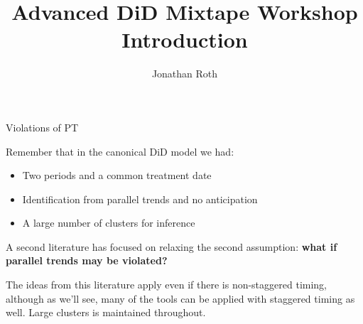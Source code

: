 \documentclass[aspectratio = 169, 13pt]{beamer}
\author{Jonathan Roth}
\title[Advanced DiD Mixtape Workshop]{Advanced DiD Mixtape Workshop \\ Introduction}
\begin{document}

\begin{frame}{Violations of PT}
  \addtocounter{framenumber}{-1}
	\begin{wideitemize}
		\item
		Remember that in the canonical DiD model we had:
		    
		\begin{itemize}
			\item 
			      Two periods and a common treatment date
			              
			\item
			      Identification from parallel trends and no anticipation
			              
			\item
			      A large number of clusters for inference
		\end{itemize}
		    
		\item
		A second literature has focused on relaxing the second assumption: \textbf{what if parallel trends may be violated?}
		    
		\item
		The ideas from this literature apply even if there is non-staggered timing, although as we'll see, many of the tools can be applied with staggered timing as well. Large clusters is maintained throughout. 
		    
	\end{wideitemize}
	
\end{frame}
\end{document}
